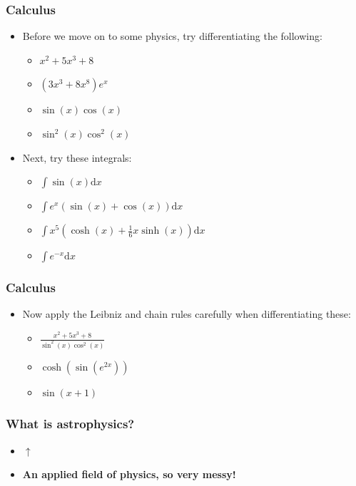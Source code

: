 \documentclass{beamer}
\begin{document}
\begin{frame}
  \frametitle{Calculus}
  \begin{itemize}
    \item<1-> Before we move on to some physics, try differentiating the following:
      \begin{itemize}
	\item<2-> $x^2+5x^3+8$
	\item<3-> $\left( 3x^3+8x^8 \right)e^x$
	\item<4-> $\sin(x)\cos(x)$
	\item<5-> $\sin^2(x)\cos^2(x)$
      \end{itemize}
    \item<6-> Next, try these integrals:
      \begin{itemize}
	\item<7-> $\int \sin(x)\mathrm{d}x$
	\item<8-> $\int e^x\left( \sin(x)+\cos(x) \right)\mathrm{d}x$
	\item<9-> $\int x^5\left( \cosh(x)+\frac{1}{6}x\sinh(x) \right)\mathrm{d}x$
	\item<10> $\int e^{-x}\mathrm{d}x$
      \end{itemize}
  \end{itemize}
\end{frame}

\begin{frame}
  \frametitle{Calculus}
  \begin{itemize}
    \item<1-> Now apply the Leibniz and chain rules carefully when differentiating these:
      \begin{itemize}
	\item<2-> $\frac{x^2+5x^3+8}{\sin^2(x)\cos^2(x)}$
	\item<3-> $\cosh(\sin(e^{2x}))$
	\item<4-> $\sin(x+1)$
      \end{itemize}
  \end{itemize}
\end{frame}

\begin{frame}
  \frametitle{What is astrophysics?}
  \begin{itemize}
    \item $\uparrow$
    \item \textbf{An applied field of physics, so very messy!}
  \end{itemize}
\end{frame}
\end{document}

